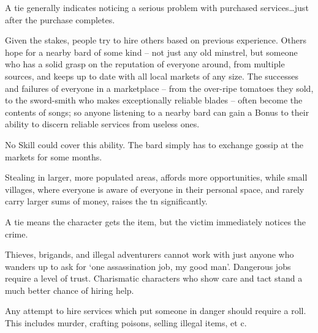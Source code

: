 \begin{multicols}{2}
A tie generally indicates noticing a serious problem with purchased services\ldots just after the purchase completes.

Given the stakes, people try to hire others based on previous experience.
Others hope for a nearby bard of some kind -- not just any old minstrel, but someone who has a solid grasp on the reputation of everyone around, from multiple sources, and keeps up to date with all local markets of any size.
The successes and failures of everyone in a marketplace -- from the over-ripe tomatoes they sold, to the sword-smith who makes exceptionally reliable blades -- often become the contents of songs; so anyone listening to a nearby bard can gain a Bonus to their ability to discern reliable services from useless ones.

No Skill could cover this ability.
The bard simply has to exchange gossip at the markets for some months.

Stealing in larger, more populated areas, affords more opportunities, while small \glspl{village}, where everyone is aware of everyone in their personal space, and rarely carry larger sums of money, raises the \gls{tn} significantly.

A tie means the character gets the item, but the victim immediately notices the crime.

\larcenyChart

Thieves, brigands, and illegal adventurers cannot work with just anyone who wanders up to ask for `one assassination job, my good man'.
Dangerous jobs require a level of trust.
Charismatic characters who show care and tact stand a much better chance of hiring help.


Any attempt to hire services which put someone in danger should require a roll.
This includes murder, crafting poisons, selling illegal items, et c.


\end{multicols}
